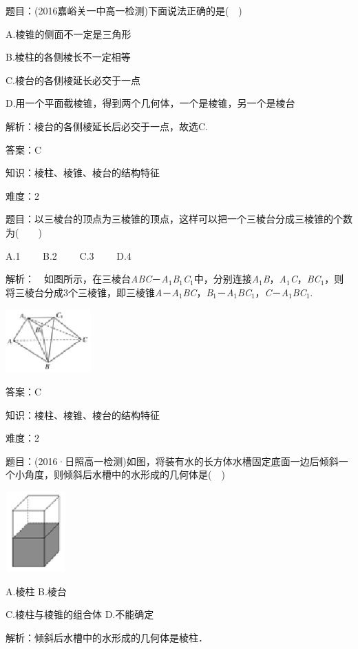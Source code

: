 \documentclass{article} %
\begin{document}
题目：(2016嘉峪关一中高一检测)下面说法正确的是(　)

A.棱锥的侧面不一定是三角形

B.棱柱的各侧棱长不一定相等

C.棱台的各侧棱延长必交于一点

D.用一个平面截棱锥，得到两个几何体，一个是棱锥，另一个是棱台

解析：棱台的各侧棱延长后必交于一点，故选C.

答案：C

知识：棱柱、棱锥、棱台的结构特征

难度：2

题目：以三棱台的顶点为三棱锥的顶点，这样可以把一个三棱台分成三棱锥的个数为(　　)

A.1　　 B.2　　 C.3　　 D.4

解析：　如图所示，在三棱台\textit{ABC}－\textit{A}${}_{1}$\textit{B}${}_{1}$\textit{C}${}_{1}$中，分别连接\textit{A}${}_{1}$\textit{B}，\textit{A}${}_{1}$\textit{C}，\textit{BC}${}_{1}$，则将三棱台分成3个三棱锥，即三棱锥\textit{A}－\textit{A}${}_{1}$\textit{BC}，\textit{B}${}_{1}$－\textit{A}${}_{1}$\textit{BC}${}_{1}$，\textit{C}－\textit{A}${}_{1}$\textit{BC}${}_{1}$.

\includegraphics*[width=1.29in, height=0.96in, keepaspectratio=false]{image9}

答案：C

知识：棱柱、棱锥、棱台的结构特征

难度：2

题目：(2016·日照高一检测)如图，将装有水的长方体水槽固定底面一边后倾斜一个小角度，则倾斜后水槽中的水形成的几何体是(　)

\includegraphics*[width=0.90in, height=1.22in, keepaspectratio=false]{image10}

A.棱柱  B.棱台

C.棱柱与棱锥的组合体 D.不能确定

解析：倾斜后水槽中的水形成的几何体是棱柱．
\end{document}
